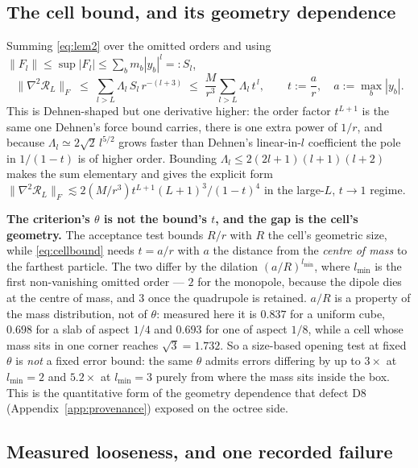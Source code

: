 \subsection{The cell bound, and its geometry dependence}

Summing \eqref{eq:lem2} over the omitted orders and using $\|F_l\|\le\sup|F_l|\le\sum_b m_b|y_b|^l=:S_l$,
\begin{equation}
\big\|\nabla^2\mathcal R_L\big\|_F
\;\le\;\sum_{l>L}\Lambda_l\,S_l\,r^{-(l+3)}
\;\le\;\frac{M}{r^{3}}\sum_{l>L}\Lambda_l\,t^{\,l},
\qquad t:=\frac{a}{r},\quad a:=\max_b|y_b| .
\label{eq:cellbound}
\end{equation}
This is Dehnen-shaped but one derivative higher: the order factor $t^{L+1}$ is the same one Dehnen's
force bound carries, there is one extra power of $1/r$, and because $\Lambda_l\simeq2\sqrt2\,l^{5/2}$
grows faster than Dehnen's linear-in-$l$ coefficient the pole in $1/(1-t)$ is of higher order.
Bounding $\Lambda_l\le2(2l+1)(l+1)(l+2)$ makes the sum elementary and gives the explicit form
$\|\nabla^2\mathcal R_L\|_F\lesssim2(M/r^3)t^{L+1}(L+1)^3/(1-t)^4$ in the large-$L$, $t\to1$ regime.

\noindent\textbf{The criterion's $\theta$ is not the bound's $t$, and the gap is the cell's geometry.}
The acceptance test bounds $R/r$ with $R$ the cell's geometric size, while \eqref{eq:cellbound} needs
$t=a/r$ with $a$ the distance from the \emph{centre of mass} to the farthest particle. The two differ
by the dilation $(a/R)^{l_{\min}}$, where $l_{\min}$ is the first non-vanishing omitted order --- $2$
for the monopole, because the dipole dies at the centre of mass, and $3$ once the quadrupole is
retained. $a/R$ is a property of the mass distribution, not of $\theta$: measured here it is $0.837$
for a uniform cube, $0.698$ for a slab of aspect $1/4$ and $0.693$ for one of aspect $1/8$, while a
cell whose mass sits in one corner reaches $\sqrt3=1.732$. So a size-based opening test at fixed
$\theta$ is \emph{not} a fixed error bound: the same $\theta$ admits errors differing by up to $3\times$
at $l_{\min}=2$ and $5.2\times$ at $l_{\min}=3$ purely from where the mass sits inside the box. This
is the quantitative form of the geometry dependence that defect D8
(Appendix~\ref{app:provenance}) exposed on the octree side.

\subsection{Measured looseness, and one recorded failure}

